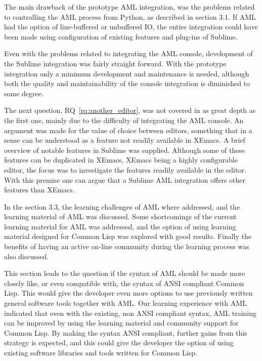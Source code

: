 The main drawback of the prototype AML integration, was the problems related to controlling the AML process from Python, as described in section 3.1. If AML had the option of line-buffered or unbuffered IO, the entire integration could have been made using configuration of existing features and plug-ins of Sublime.

Even with the problems related to integrating the AML console, development of the Sublime integration was fairly straight forward. With the prototype integration only a minimum development and maintenance is needed, although both the quality and maintainability of the console integration is diminished to some degree.

The next question, RQ~\ref{rq:another_editor}, was not covered in as great depth as the first one, mainly due to the difficulty of integrating the AML console. An argument was made for the value of choice between editors, something that in a sense can be understood as a feature not readily available in XEmacs. A brief overview of notable features in Sublime was supplied. Although some of these features can be duplicated in XEmacs, XEmacs being a highly configurable editor, the focus was to investigate the features readily available in the editor. With this premise one can argue that a Sublime AML integration offers other features than XEmacs.

In the section 3.3, the learning challenges of AML where addressed, and the learning material of AML was discussed. Some shortcomings of the current learning material for AML was addressed, and the option of using learning material designed for Common Lisp was explored with good results. Finally the benefits of having an active on-line community during the learning process was also discussed.

This section leads to the question if the syntax of AML should be made more closely like, or even compatible with, the syntax of ANSI compliant Common Lisp. This would give the developer even more options to use previously written general software tools together with AML. Our learning experience with AML indicated that even with the existing, non ANSI compliant syntax, AML training can be improved by using the learning material and community support for Common Lisp. By making the syntax ANSI compliant, further gains from this strategy is expected, and this could give the developer the option of using existing software libraries and tools written for Common Lisp.

